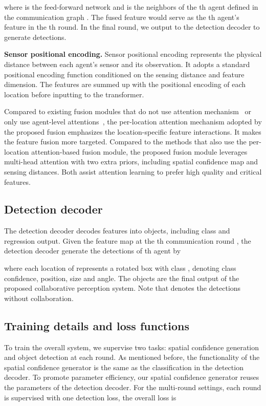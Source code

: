 \documentclass{article}
\begin{document}
where  is the feed-forward network and  is the neighbors of the th agent defined in the communication graph . The fused feature  would serve as the th agent's feature in the th round. In the final round, we output  to the detection decoder to generate detections.

\textbf{Sensor positional encoding.} Sensor positional encoding represents the physical distance between each agent's sensor and its observation.  It adopts a standard positional encoding function conditioned on the sensing distance and feature dimension. The features are summed up with the positional encoding of each location before inputting to the transformer.

Compared to existing fusion modules that do not use attention mechanism~\cite{v2vnet} or only use agent-level attentions~\cite{when2com}, the per-location attention mechanism adopted by the proposed fusion emphasizes the location-specific feature interactions. It  makes the feature fusion more targeted. Compared to the methods that also use the per-location attention-based fusion module\cite{disconet,OPV2V,xu2022v2x}, the proposed fusion module leverages multi-head attention with two extra priors, including spatial confidence map and sensing distances. Both assist attention learning to prefer high quality and critical features.

\vspace{-2mm}
\subsection{Detection decoder}
\label{sec:Decoder}
\vspace{-2mm}
The detection decoder decodes features into objects, including class and regression output. 
Given the feature map at the th communication round , the detection decoder  generate the detections of th agent by

where each location of  represents a rotated box with class , denoting class confidence, position, size and angle. The objects are the final output of the proposed collaborative perception system. Note that  denotes the detections without collaboration.

\vspace{-2mm}
\subsection{Training details and loss functions}
\vspace{-2mm}
To train the overall system, we supervise two tasks: spatial confidence generation and object detection at each round. As mentioned before, the functionality of the spatial confidence generator is the same as the classification in the detection decoder. To promote parameter efficiency, our spatial confidence generator reuses the parameters of the detection decoder. For the multi-round settings, each round is supervised with one detection loss, the overall loss is
\end{document}
